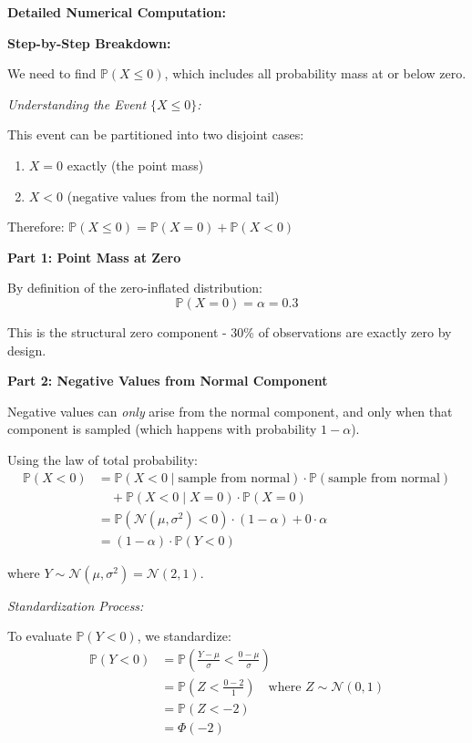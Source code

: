 \documentclass[12pt]{article}
\begin{document}
\begin{explanation}
\textbf{Detailed Numerical Computation:}

\textbf{Step-by-Step Breakdown:}

We need to find \(\mathbb{P}(X \leq 0)\), which includes all probability mass at or below zero.

\textit{Understanding the Event \(\{X \leq 0\}\):}

This event can be partitioned into two disjoint cases:
\begin{enumerate}
    \item \(X = 0\) exactly (the point mass)
    \item \(X < 0\) (negative values from the normal tail)
\end{enumerate}

Therefore: \(\mathbb{P}(X \leq 0) = \mathbb{P}(X = 0) + \mathbb{P}(X < 0)\)

\textbf{Part 1: Point Mass at Zero}

By definition of the zero-inflated distribution:
\[
\mathbb{P}(X = 0) = \alpha = 0.3
\]

This is the structural zero component - 30\% of observations are exactly zero by design.

\textbf{Part 2: Negative Values from Normal Component}

Negative values can \textit{only} arise from the normal component, and only when that component is sampled (which happens with probability \(1-\alpha\)).

Using the law of total probability:
\begin{align*}
\mathbb{P}(X < 0) &= \mathbb{P}(X < 0 \mid \text{sample from normal}) \cdot \mathbb{P}(\text{sample from normal}) \\
&\quad + \mathbb{P}(X < 0 \mid X = 0) \cdot \mathbb{P}(X = 0) \\
&= \mathbb{P}(\mathcal{N}(\mu, \sigma^2) < 0) \cdot (1-\alpha) + 0 \cdot \alpha \\
&= (1-\alpha) \cdot \mathbb{P}(Y < 0)
\end{align*}

where \(Y \sim \mathcal{N}(\mu, \sigma^2) = \mathcal{N}(2, 1)\).

\textit{Standardization Process:}

To evaluate \(\mathbb{P}(Y < 0)\), we standardize:
\begin{align*}
\mathbb{P}(Y < 0) &= \mathbb{P}\left(\frac{Y - \mu}{\sigma} < \frac{0 - \mu}{\sigma}\right) \\
&= \mathbb{P}\left(Z < \frac{0 - 2}{1}\right) \quad \text{where } Z \sim \mathcal{N}(0, 1) \\
&= \mathbb{P}(Z < -2) \\
&= \Phi(-2)
\end{align*}


\end{explanation}
\end{document}
